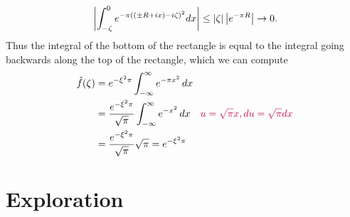 \documentclass{homework}
\begin{document}
\begin{solution}
\[                                                \left|\int_{-\zeta}^{0} e^{-\pi((\pm R+ix) -i\zeta)^2} dx\right| \leq \left|\zeta\right| \left|e^{-\pi R}\right|\to 0.
                                                \]
                                                Thus the integral of the bottom of the rectangle is equal to the integral going backwards along the top of the rectangle, which we can compute
                                                \begin{align*}
                                                \hat f(\zeta) &=  e^{-\xi^2\pi}\int_{-\infty}^\infty e^{-\pi x^2} \,dx\\
                                                &=  \frac{e^{-\xi^2\pi}}{\sqrt{\pi}}\int_{-\infty}^\infty e^{-x^2} \,dx\quad \color{purple} u = \sqrt{\pi}x, du = \sqrt{\pi} dx\\
                                                &=  \frac{e^{-\xi^2\pi}}{\sqrt{\pi}} \sqrt{\pi} =  e^{-\xi^2\pi}
                                                \end{align*}

                                                \end{solution}
                                                \section{Exploration}
\end{document}
